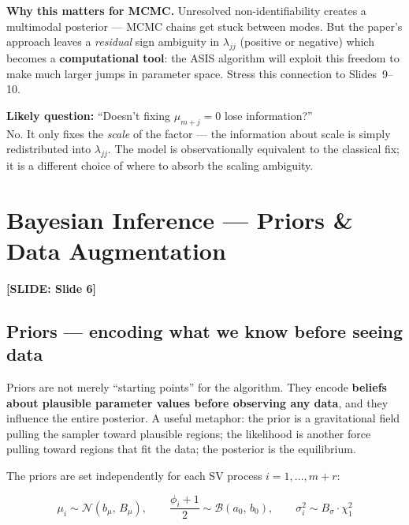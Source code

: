 \documentclass[11pt, a4paper]{article}\usepackage[]{graphicx}\usepackage[]{xcolor}
\newcommand{\slidetag}[1]{%
  \noindent\textcolor{MainBlue}{\footnotesize\textbf{[SLIDE: #1]}}%
  \vspace{0.2em}\par
}
\newcommand{\stress}[1]{\textbf{#1}}
\begin{document}
\begin{remarkbox}
  \textbf{Why this matters for MCMC.}
  Unresolved non-identifiability creates a multimodal posterior --- MCMC
  chains get stuck between modes.  But the paper's approach leaves a
  \textit{residual} sign ambiguity in $\lambda_{jj}$ (positive or negative)
  which becomes a \stress{computational tool}: the ASIS algorithm will exploit
  this freedom to make much larger jumps in parameter space.  Stress this
  connection to Slides~9--10.
\end{remarkbox}

\begin{remarkbox}
  \textbf{Likely question:} ``Doesn't fixing $\mu_{m+j}=0$ lose information?''\\
  No.  It only fixes the \textit{scale} of the factor --- the information
  about scale is simply redistributed into $\lambda_{jj}$.  The model is
  observationally equivalent to the classical fix; it is a different choice
  of where to absorb the scaling ambiguity.
\end{remarkbox}

\section{Bayesian Inference --- Priors \& Data Augmentation}

\slidetag{Slide 6}

\subsection{Priors --- encoding what we know before seeing data}

Priors are not merely ``starting points'' for the algorithm.  They encode
\stress{beliefs about plausible parameter values before observing any data},
and they influence the entire posterior.  A useful metaphor: the prior is a
gravitational field pulling the sampler toward plausible regions; the
likelihood is another force pulling toward regions that fit the data; the
posterior is the equilibrium.

The priors are set independently for each SV process $i = 1, \ldots, m+r$:

\begin{formulabox}
\[
  \mu_i \sim \mathcal{N}(b_\mu,\, B_\mu),
  \qquad
  \frac{\phi_i + 1}{2} \sim \mathcal{B}(a_0,\, b_0),
  \qquad
  \sigma_i^2 \sim B_\sigma \cdot \chi^2_1
\]
\end{formulabox}
\end{document}
